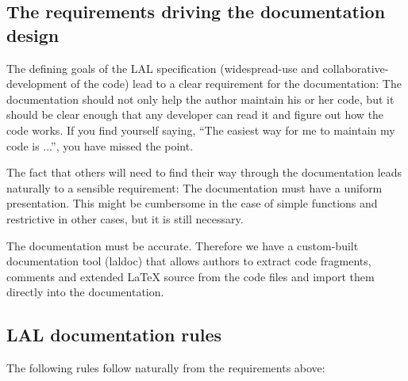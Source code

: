 \documentclass[]{ligodcc}
\begin{document}
\subsection{The requirements driving  the documentation design}

The defining goals of the LAL specification (widespread-use and
collaborative-development of the code) lead to a clear requirement for
the documentation: The documentation should not  only help the author
maintain his or her code, but it should be clear enough that any
developer can read it and figure out how the code works. If you find
yourself saying, ``The easiest way for me to maintain my code is
...'',  you have missed the point.

The fact that others will need to find their way through the
documentation  leads naturally to a sensible requirement: The
documentation must have a uniform presentation. This might be
cumbersome in the case of simple functions  and restrictive in other
cases, but it is still necessary.

The documentation must be accurate. Therefore we have a custom-built
documentation tool (laldoc) that  allows authors to extract code
fragments, comments and extended LaTeX source from the code files and
import them  directly into the documentation.


\subsection{LAL documentation rules}

The following rules follow naturally from the requirements above:
\end{document}
